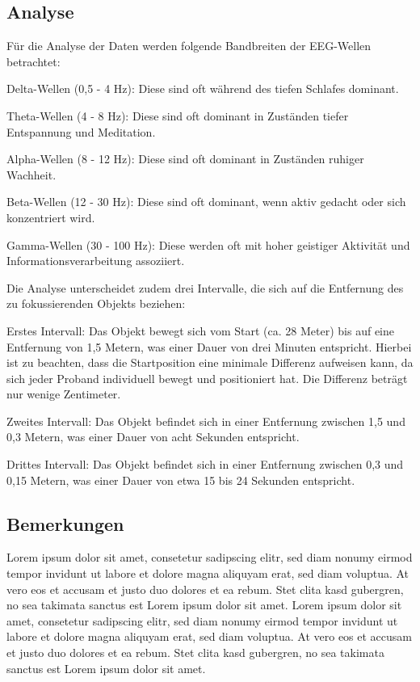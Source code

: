 \documentclass[conference]{IEEEtran}
\begin{document}
\subsection{Analyse}
Für die Analyse der Daten werden folgende Bandbreiten der EEG-Wellen betrachtet:
\begin{myitemize}
    \item Delta-Wellen (0,5 - 4 Hz): Diese sind oft während des tiefen Schlafes dominant.
    \item Theta-Wellen (4 - 8 Hz): Diese sind oft dominant in Zuständen tiefer Entspannung und Meditation.
    \item Alpha-Wellen (8 - 12 Hz): Diese sind oft dominant in Zuständen ruhiger Wachheit.
    \item Beta-Wellen (12 - 30 Hz): Diese sind oft dominant, wenn aktiv gedacht oder sich konzentriert wird.
    \item Gamma-Wellen (30 - 100 Hz): Diese werden oft mit hoher geistiger Aktivität und Informationsverarbeitung assoziiert.
\end{myitemize}

Die Analyse unterscheidet zudem drei Intervalle, die sich auf die Entfernung des zu fokussierenden Objekts beziehen:

\begin{myitemize}
    \item Erstes Intervall: Das Objekt bewegt sich vom Start (ca. 28 Meter) bis auf eine Entfernung von 1,5 Metern, was einer Dauer von drei Minuten entspricht. Hierbei ist zu beachten, dass die Startposition eine minimale Differenz aufweisen kann, da sich jeder Proband individuell bewegt und positioniert hat. Die Differenz beträgt nur wenige Zentimeter.
    \item Zweites Intervall: Das Objekt befindet sich in einer Entfernung zwischen 1,5 und 0,3 Metern, was einer Dauer von acht Sekunden entspricht.
    \item Drittes Intervall: Das Objekt befindet sich in einer Entfernung zwischen 0,3 und 0,15 Metern, was einer Dauer von etwa 15 bis 24 Sekunden entspricht.
\end{myitemize}



\subsection{Bemerkungen}
Lorem ipsum dolor sit amet, consetetur sadipscing elitr, sed diam nonumy eirmod tempor invidunt ut labore et dolore magna aliquyam erat, sed diam voluptua. At vero eos et accusam et justo duo dolores et ea rebum. Stet clita kasd gubergren, no sea takimata sanctus est Lorem ipsum dolor sit amet. Lorem ipsum dolor sit amet, consetetur sadipscing elitr, sed diam nonumy eirmod tempor invidunt ut labore et dolore magna aliquyam erat, sed diam voluptua. At vero eos et accusam et justo duo dolores et ea rebum. Stet clita kasd gubergren, no sea takimata sanctus est Lorem ipsum dolor sit amet.
\end{document}
